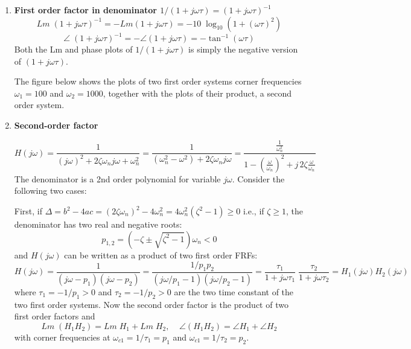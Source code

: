\documentclass{article}
\begin{document}
\begin{enumerate}
\item {\bf First order factor in denominator $1/(1+j\omega\tau)=(1+j\omega\tau)^{-1}$}
  \begin{equation} Lm\;(1+j\omega\tau)^{-1}=-Lm(1+j\omega\tau)
  =-10\;\log_{10}(1+(\omega \tau)^2) \end{equation}
  \begin{equation} \angle\;(1+j\omega \tau)^{-1}=-\angle(1+j\omega \tau)
  =-\tan^{-1}(\omega\tau) \end{equation}
  Both the Lm and phase plots of $1/(1+j\omega\tau)$ is simply the negative 
  version of $(1+j\omega\tau)$. 

  The figure below shows the plots of two first order systems corner frequencies 
  $\omega_1=100$ and $\omega_2=1000$, together with the plots of their product, a 
  second order system.


\item {\bf Second-order factor}

  \begin{equation} H(j\omega)=\frac{1}{(j\omega)^2+2\zeta\omega_n j\omega+\omega_n^2}
  =\frac{1}{(\omega^2_n-\omega^2)+2\zeta\omega_n j\omega}
  =\frac{\frac{1}{\omega_n^2}}{1-(\frac{\omega}{\omega_n})^2+j\,2\zeta\frac{\omega}{\omega_n}} \end{equation}
  The denominator is a 2nd order polynomial for variable $j\omega$. Consider the
  following two cases:

  First, if $\Delta=b^2-4ac=(2\zeta\omega_n)^2-4\omega_n^2=4\omega^2_n(\zeta^2-1)\ge 0$
  i.e., if $\zeta\ge 1$, the denominator has two real and negative roots:
  \begin{equation} p_{1,2}=(-\zeta\pm\sqrt{\zeta^2-1})\omega_n < 0 \end{equation}
  and $H(j\omega)$ can be written as a product of two first order FRFs:
  \begin{equation} H(j\omega)=\frac{1}{(j\omega-p_1)(j\omega-p_2)} 
  =\frac{1/p_1p_2}{(j\omega/p_1-1)(j\omega/p_2-1)} 
  =\frac{\tau_1}{1+j\omega\tau_1}\;\frac{\tau_2}{1+j\omega\tau_2}
  =H_1(j\omega)H_2(j\omega) \end{equation}
  where $\tau_1=-1/p_1>0$ and $\tau_2=-1/p_2>0$ are the two time constant of the two
  first order systems. Now the second order factor is the product of two first order 
  factors and
  \begin{equation} Lm\;(H_1 H_2)=Lm\; H_1+Lm\; H_2,\;\;\;\;\angle (H_1 H_2)=\angle H_1+\angle H_2 \end{equation}
  with corner frequencies at $\omega_{c1}=1/\tau_1=p_1$ and $\omega_{c1}=1/\tau_2=p_2$.


\end{enumerate}
\end{document}
